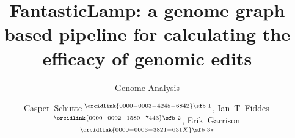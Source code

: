 \documentclass{bioinfo}
\theoremstyle{definition}
\begin{document}

\subtitle{Genome Analysis}

\title[FantasticLamp]{FantasticLamp: a genome graph based pipeline for calculating the efficacy of genomic edits}
\author[Schutte \textit{et~al}.]{

Casper~Schutte\,$^{\orcidlink{0000-0003-4245-6842}\text{\sfb 1}}$,
Ian~T~Fiddes\,$^{\orcidlink{0000-0002-1580-7443}\text{\sfb 2}}$,
Erik~Garrison\,$^{\orcidlink{0000-0003-3821-631X}\text{\sfb 3}*}$
}

\address{
$^{\text{\sf 1}}$Department of Bioinformatics and Computational Biology, University of Stellenbosch, Stellenbosch, 7600, Western Cape, South Africa \\
$^{\text{\sf 2}}$10x Genomics, Pleasanton, CA \\
$^{\text{\sf 3}}$Department of Genetics, Genomics and Informatics, University of Tennessee Health Science Center, Memphis, 38163, Tennessee, USA \\
}



\end{document}
